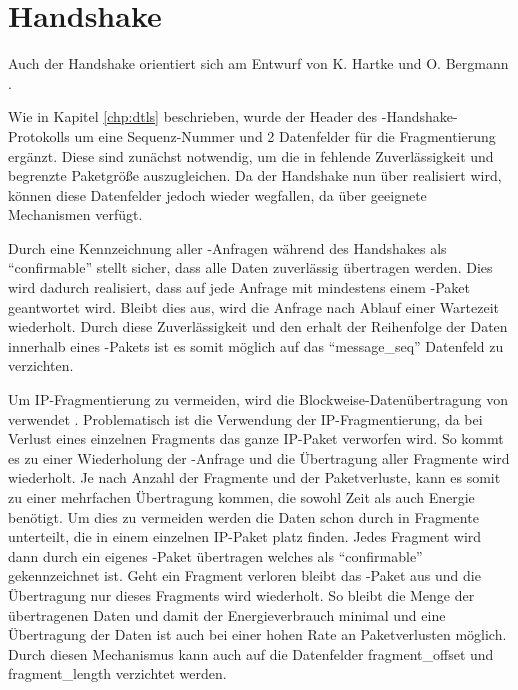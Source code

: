 \section{Handshake}
\label{sec:handshake}

Auch der Handshake orientiert sich am Entwurf von K. Hartke und O. Bergmann \cite[Kapitel 4]{draftcodtls}.

Wie in Kapitel \ref{chp:dtls} beschrieben, wurde der Header des -Handshake-Protokolls um eine Sequenz-Nummer
und 2 Datenfelder für die Fragmentierung ergänzt. Diese sind zunächst notwendig, um die in  fehlende Zuverlässigkeit
und begrenzte Paketgröße auszugleichen. Da der Handshake nun über  realisiert wird, können diese Datenfelder jedoch
wieder wegfallen, da  über geeignete Mechanismen verfügt.

Durch eine Kennzeichnung aller -Anfragen während des Handshakes als "`confirmable"' stellt  sicher, dass
alle Daten zuverlässig übertragen werden. Dies wird dadurch realisiert, dass auf jede Anfrage mit mindestens einem -Paket
geantwortet wird. Bleibt dies aus, wird die Anfrage nach Ablauf einer Wartezeit wiederholt. Durch diese Zuverlässigkeit und den
erhalt der Reihenfolge der Daten innerhalb eines -Pakets ist es somit möglich auf das "`message\_seq"' Datenfeld zu verzichten.

Um IP-Fragmentierung zu vermeiden, wird die Blockweise-Datenübertragung von  verwendet \cite{draftcoapblock}. Problematisch ist die Verwendung
der IP-Fragmentierung, da bei Verlust eines einzelnen Fragments das ganze IP-Paket verworfen wird. So kommt es zu einer Wiederholung
der -Anfrage und die Übertragung aller Fragmente wird wiederholt. Je nach Anzahl der Fragmente und der Paketverluste, kann
es somit zu einer mehrfachen Übertragung kommen, die sowohl Zeit als auch Energie benötigt. Um dies zu vermeiden werden die Daten schon
durch  in Fragmente unterteilt, die in einem einzelnen IP-Paket platz finden. Jedes Fragment wird dann durch ein eigenes
-Paket übertragen welches als "`confirmable"' gekennzeichnet ist. Geht ein Fragment verloren bleibt das -Paket aus
und die Übertragung nur dieses Fragments wird wiederholt. So bleibt die Menge der übertragenen Daten und damit der Energieverbrauch
minimal und eine Übertragung der Daten ist auch bei einer hohen Rate an Paketverlusten möglich. Durch diesen Mechanismus kann auch
auf die Datenfelder fragment\_offset und fragment\_length verzichtet werden.

